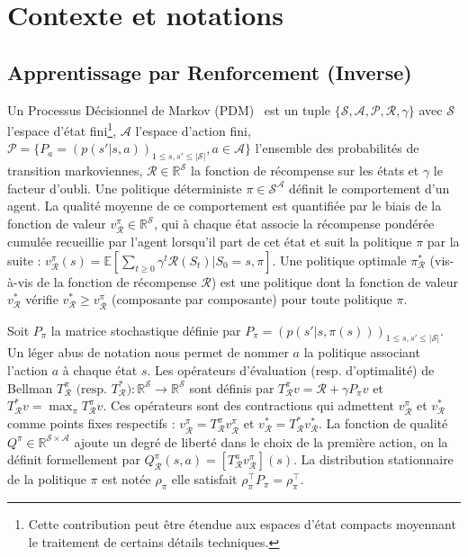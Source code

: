 \documentclass[english,utf8]{./hermes-journal}
\newcommand{\p}{\mathcal{P}}
\newcommand{\R}{\mathcal{R}}
\newcommand{\s}{\mathcal{S}}
\newcommand{\A}{\mathcal{A}}
\newcommand{\E}{\mathbb{E}}
\begin{document}
\section{Contexte et notations}
\label{sec:background}

\subsection{Apprentissage par Renforcement (Inverse)}
\label{subsec:background:irl}

Un Processus Décisionnel de Markov (PDM)~\cite{Puterman:1994} est un tuple $\{\s,\A,\p,\R,\gamma\}$ avec $\s$ l'espace d'état fini\footnote{Cette contribution peut être étendue aux espaces d'état compacts moyennant le traitement de certains détails techniques.}, $\A$ l'espace d'action fini, $\p =
\{P_a = (p(s'|s,a))_{1\leq s,s'\leq |\s|}, a\in\A\}$ l'ensemble des probabilités de transition markoviennes, $\R\in\mathbb{R}^\s$ la fonction de récompense sur les états et $\gamma$ le facteur d'oubli.
Une politique déterministe $\pi\in\s^\A$ définit le comportement d'un agent. La qualité moyenne de ce comportement est quantifiée par le biais de la fonction de valeur $v_\R^\pi\in\mathbb{R}^\s$, qui à chaque état associe la récompense pondérée cumulée recueillie par l'agent lorsqu'il part de cet état et suit la politique $\pi$ par la suite : $v_\R^\pi(s) = \E[\sum_{t\geq 0} \gamma^t \R(S_t)|S_0=s,\pi]$. Une politique optimale $\pi_\R^*$ (vis-à-vis de la fonction de récompense $\R$) est une politique dont la fonction de valeur $v^*_\R$ vérifie $v_\R^* \geq v_\R^\pi$ (composante par composante) pour toute politique $\pi$.

Soit $P_\pi$ la matrice stochastique définie par $P_\pi =
(p(s'|s,\pi(s)))_{1\leq s,s'\leq |\s|}$. Un léger abus de notation nous permet de nommer $a$ la politique associant l'action $a$ à chaque état $s$. Les opérateurs d'évaluation (resp. d'optimalité) de Bellman $T^\pi_\R\text{ (resp. $T^*_\R$)}:\mathbb{R}^\s
\rightarrow \mathbb{R}^\s$ sont définis par $T^\pi_\R v = \R + \gamma
P_\pi v$ et $T_\R^*v = \max_\pi T_\R^\pi v$.
Ces opérateurs sont des contractions qui admettent $v_\R^\pi$ et $v^*_\R$ comme points fixes respectifs : $v_\R^\pi = T^\pi_\R v_\R^\pi$ et $v^*_\R = T^*_\R v^*_\R$.
La fonction de qualité $Q^\pi\in\mathbb{R}^{\s\times \A}$ ajoute un degré de liberté dans le choix de la première action, on la définit formellement par $Q_\R^\pi(s,a)
= [T^a_\R v^\pi_\R](s)$. La distribution stationnaire de la politique $\pi$ est notée $\rho_\pi$ elle satisfait $\rho_\pi^\top P_\pi = \rho_\pi^\top$.
\end{document}
